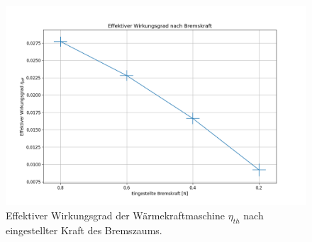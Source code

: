 \begin{figure}[H]
    \centering
    \includegraphics[width=.9\textwidth]{files/eta_eff_brems.png}
    \caption{Effektiver Wirkungsgrad der Wärmekraftmaschine $\eta_{th}$ nach eingestellter Kraft des Bremszaums.}
    \label{fig:eta_eff_brems}
\end{figure}